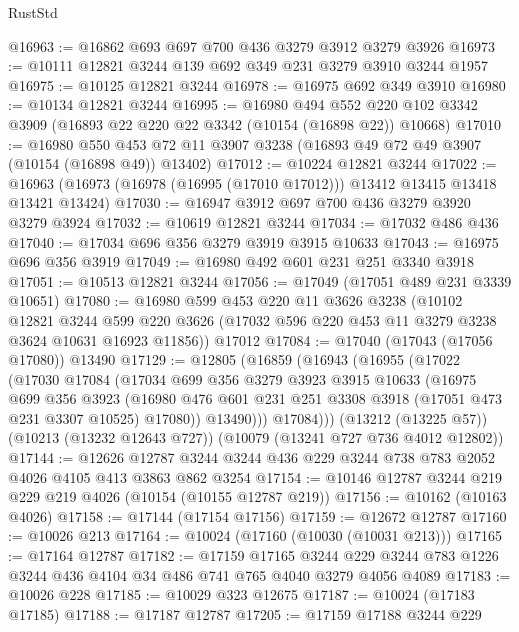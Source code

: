\begin{lexlean}{RustStd}
\begin{coremodule}
@16963 := @16862 @693 @697 @700 @436 @3279 @3912 @3279 @3926
@16973 := @10111 @12821 @3244 @139 @692 @349 @231 @3279 @3910 @3244 @1957
@16975 := @10125 @12821 @3244
@16978 := @16975 @692 @349 @3910
@16980 := @10134 @12821 @3244
@16995 := @16980
    @494
    @552
    @220
    @102
    @3342
    @3909
    (@16893 @22 @220 @22 @3342 (@10154 (@16898 @22)) @10668)
@17010 := @16980
    @550
    @453
    @72
    @11
    @3907
    @3238
    (@16893 @49 @72 @49 @3907 (@10154 (@16898 @49)) @13402)
@17012 := @10224 @12821 @3244
@17022 := @16963 (@16973 (@16978 (@16995 (@17010 @17012))) @13412 @13415 @13418 @13421 @13424)
@17030 := @16947 @3912 @697 @700 @436 @3279 @3920 @3279 @3924
@17032 := @10619 @12821 @3244
@17034 := @17032 @486 @436
@17040 := @17034 @696 @356 @3279 @3919 @3915 @10633
@17043 := @16975 @696 @356 @3919
@17049 := @16980 @492 @601 @231 @251 @3340 @3918
@17051 := @10513 @12821 @3244
@17056 := @17049 (@17051 @489 @231 @3339 @10651)
@17080 := @16980
    @599
    @453
    @220
    @11
    @3626
    @3238
    (@10102
      @12821
      @3244
      @599
      @220
      @3626
      (@17032 @596 @220 @453 @11 @3279 @3238 @3624 @10631 @16923 @11856))
    @17012
@17084 := @17040 (@17043 (@17056 @17080)) @13490
@17129 := @12805
    (@16859
      (@16943
        (@16955
          (@17022
            (@17030
              @17084
              (@17034
                @699
                @356
                @3279
                @3923
                @3915
                @10633
                (@16975
                  @699
                  @356
                  @3923
                  (@16980 @476 @601 @231 @251 @3308 @3918 (@17051 @473 @231 @3307 @10525) @17080))
                @13490)))
          @17084)))
    (@13212 (@13225 @57))
    (@10213 (@13232 @12643 @727))
    (@10079 (@13241 @727 @736 @4012 @12802))
@17144 := @12626
    @12787
    @3244
    @3244
    @436
    @229
    @3244
    @738
    @783
    @2052
    @4026
    @4105
    @413
    @3863
    @862
    @3254
@17154 := @10146 @12787 @3244 @219 @229 @219 @4026 (@10154 (@10155 @12787 @219))
@17156 := @10162 (@10163 @4026)
@17158 := @17144 (@17154 @17156)
@17159 := @12672 @12787
@17160 := @10026 @213
@17164 := @10024 (@17160 (@10030 (@10031 @213)))
@17165 := @17164 @12787
@17182 := @17159
    @17165
    @3244
    @229
    @3244
    @783
    @1226
    @3244
    @436
    @4104
    @34
    @486
    @741
    @765
    @4040
    @3279
    @4056
    @4089
@17183 := @10026 @228
@17185 := @10029 @323 @12675
@17187 := @10024 (@17183 @17185)
@17188 := @17187 @12787
@17205 := @17159
    @17188
    @3244
    @229

\end{coremodule}
\end{lexlean}
